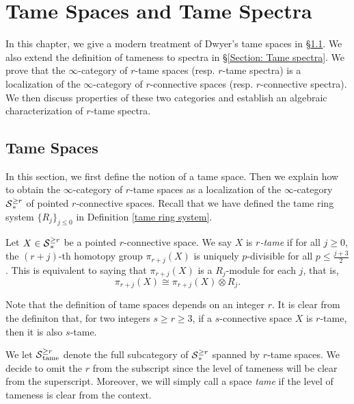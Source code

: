 \chapter{Tame Spaces and Tame Spectra}
In this chapter, we give a modern treatment of Dwyer's tame spaces in \S \ref{Section Tame spaces}. We also extend the definition of tameness to spectra in \S \ref{Section: Tame spectra}.
We prove that the $\infty$-category of $r$-tame spaces (resp. $r$-tame spectra) is a localization of the $\infty$-category of $r$-connective spaces (resp. $r$-connective spectra).
We then discuss properties of these two categories and establish an algebraic characterization of $r$-tame spectra.

\section{Tame Spaces}
\label{Section Tame spaces}
In this section, we first define the notion of a tame space.
Then we explain how to obtain the $\infty$-category of $r$-tame spaces as a localization of the $\infty$-category $\operatorname{\mathcal{S}}_{*}^{\geq r}$ of pointed $r$-connective spaces.
Recall that we have defined the tame ring system $\{R_{j}\}_{j \leq 0}$ in Definition \ref{tame ring system}.

\begin{definition}
	\label{Tame spaces}
	Let $X\in \operatorname{\mathcal{S}}_{*}^{\geq r}$ be a pointed $r$-connective space.
	We say $X$ is \emph{$r$-tame} if for all $j\geq 0$, the $(r+j)$-th homotopy group $\pi_{r+j}(X)$ is uniquely $p$-divisible for all $p\leq \frac{j+3}{2}$. 
	This is equivalent to saying that $\pi_{r+j}(X)$ is a $R_j$-module for each $j$, that is,
	\[
	\pi_{r+j}(X)\cong \pi_{r+j}(X)\otimes R_{j}.
	\]
\end{definition}

    \begin{remark}
        Note that the definition of tame spaces depends on an integer $r$.
        It is clear from the definiton that,
        for two integers $s\geq r \geq 3$, if a $s$-connective space $X$ is $r$-tame, then it is also $s$-tame. 
    \end{remark}
    
    \begin{notation}
        We let $\operatorname{\mathcal{S}}^{\geq r}_{\operatorname{\operatorname{tame}}}$ denote the full subcategory of $\operatorname{\mathcal{S}}^{\geq r}_{*}$ spanned by $r$-tame spaces.
       We decide to omit the $r$ from the subscript since the level of tameness will be clear from the superscript.
       Moreover, we will simply call a space \emph{tame} if the level of tameness is clear from the context.
    \end{notation}
    

